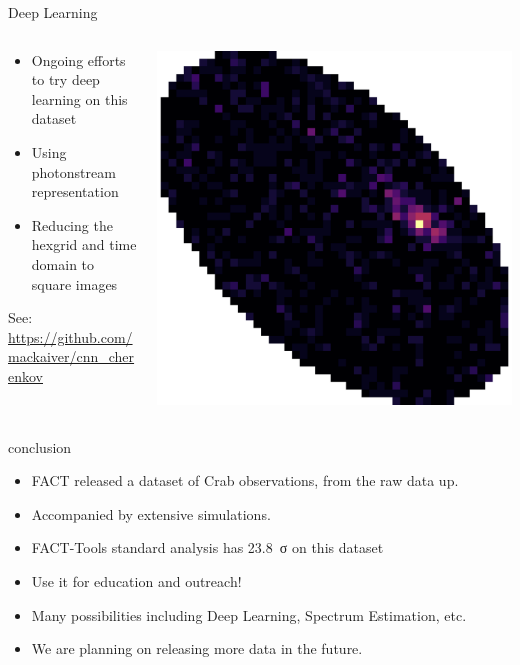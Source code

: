 \documentclass[compress, 9pt, aspectratio=1610, professionalfonts]{beamer}
\begin{document}
\begin{frame}[t]{Deep Learning}
  \begin{columns}[onlytextwidth]
    \begin{column}{0.55\textwidth}
      \begin{itemize}
        \item Ongoing efforts to try deep learning on this dataset
        \item Using photonstream representation
        \item Reducing the hexgrid and time domain to square images
      \end{itemize}

      See: \url{https://github.com/mackaiver/cnn_cherenkov}
    \end{column}
    \begin{column}{0.4\textwidth}
      \includegraphics[width=\textwidth]{images/shower_skewed.png}
    \end{column}
  \end{columns}
\end{frame}

\begin{frame}[c]{conclusion}
  \begin{itemize}
    \item FACT released a dataset of Crab observations, from the raw data up.
    \item Accompanied by extensive simulations.
    \item FACT-Tools standard analysis has \SI{23.8}{σ} on this dataset
    \item Use it for education and outreach!
    \item Many possibilities including Deep Learning, Spectrum Estimation, etc.
    \item We are planning on releasing more data in the future.
  \end{itemize}
\end{frame}
\end{document}
